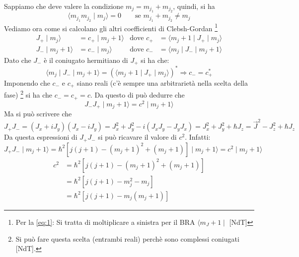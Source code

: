 Sappiamo che deve valere la condizione $m_{j}= m_{j_{1}} + m_{j_{2}}$, quindi,
si ha
\begin{equation}
\langle m_{j_{1}} m_{j_{2}} \mid m_{j} \rangle = 0 \quad \quad \text{se 
$m_{j_{1}} + m_{j_{2}} \neq m_{j}$}
\end{equation}
Vediamo ora come si calcolano gli altri coefficienti di Clebsh-Gordan
\footnote{Per la \eqref{eq:1}: Si tratta di moltiplicare a sinistra per il BRA
$\langle m_J + 1 \mid$ [NdT]}
\begin{align}
\label{eq:1}
J_{+} \mid m_{j} \rangle &= c_{+} \mid m_{j} + 1 \rangle & \text{dove } c_{+} 
&= \langle m_{j} +1 \mid J_{+} \mid m_{j} \rangle \\
J_{-} \mid m_{j} +1 \rangle &= c_{-} \mid m_{j} \rangle & \text{dove } c_{-} &= 
\langle m_{j} \mid J_{-} \mid m_{j} +1 \rangle 
\end{align}
Dato che $J_{-}$ è il coniugato hermitiano di $J_{+}$ si ha che:
\begin{equation}
\langle m_{j} \mid J_{-} \mid m_{j} +1 \rangle = \left( \langle m_{j} +1 \mid 
J_{+} \mid m_{j} \rangle \right) ^{*} \Rightarrow c_{-} = c_{+} ^{*}
\end{equation}
Imponendo che $c_{-}$ e $c_{+}$ siano reali (c'è sempre una arbitrarietà nella
scelta della fase) \footnote{Si può fare questa scelta (entrambi reali) perchè
sono complessi coniugati [NdT].} si ha che $c_{-} = c_{+} = c$. Da questo di
può dedurre che
\begin{equation}
J_{-}J_{+} \mid m_{j} + 1 \rangle = c^{2} \mid m_{j} + 1 \rangle
\end{equation}
Ma si può scrivere che
\begin{equation}
J_{+}J_{-} = \left( J_{x} + iJ_{y} \right)\left( J_{x} - iJ_{y} \right) = 
J_{x}^{2}  + J_{y}^{2} - i\left(J_{x}J_{y} - J_{y}J_{x} \right) = J_{x}^{2}  + 
J_{y}^{2} + \hbar J_{z} = \vec{J}^{2} - J_{z} ^{2} + \hbar J_{z}
\end{equation}
Da questa espressioni di $J_{+}J_{-}$ si può ricavare il valore di $c^{2}$.
Infatti:
\begin{equation}
J_{+}J_{-} \mid m_{j} +1 \rangle = \hbar ^{2} \left[j\left(j+1\right) -
\left(m_{j} +1\right)^{2} + \left(m_{j} + 1 \right) \right] \mid m_{j} + 1
\rangle = c^{2}\mid m_{j} +1 \rangle
\end{equation}
\begin{equation}
\begin{split}
c^{2} &= \hbar ^{2}  \left[j\left(j+1\right) - \left(m_{j} +1\right)^{2} +
\left(m_{j} + 1 \right) \right] \\
&= \hbar ^{2} \left[ j\left(j+1\right) - m_{j}^{2} - m_{j}\right] \\
&= \hbar ^{2} \left[j\left(j+1\right) - m_{j}\left(m_{j} +1\right)\right]
\end{split}
\end{equation}
